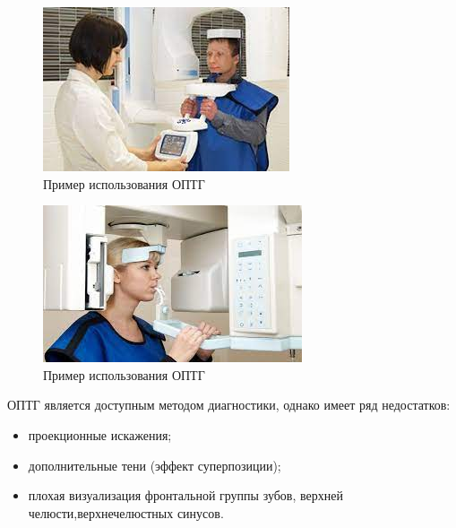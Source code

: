 \documentclass[11pt]{article}
\begin{document}
	\begin{figure}[H]
	\centering
	\includegraphics[width=\textwidth]{optg_3}
	\caption{Пример использования ОПТГ}
	\label{fig:optg_3}
	\end{figure}

	\begin{figure}[H]
	\centering
	\includegraphics[width=\textwidth]{optg_4}
	\caption{Пример использования ОПТГ}
	\label{fig:optg_4}
	\end{figure}

	ОПТГ является доступным методом диагностики, однако имеет ряд недостатков: 
	\begin{itemize} 
	\item проекционные искажения; 
	\item дополнительные тени (эффект суперпозиции); 
	\item плохая визуализация фронтальной группы зубов, верхней челюсти,верхнечелюстных синусов. 
	\end{itemize} 
	
\end{document}
